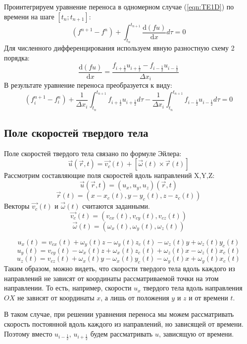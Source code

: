 \documentclass[10pt,a4paper]{article}
\begin{document}
Проинтегрируем уравнение переноса в одномерном случае (\ref{eqn:TE1D}) по времени на шаге $[t_n; t_{n+1}]$:
\[
(f^{n+1}-f^n)+\int_{t_n}^{t_{n+1}}\frac{\text{d}(f u)}{\text{d}x}d\tau=0
\]
Для численного дифференцирования используем явную разностную схему 2 порядка:
\[
\frac{\text{d}(f u)}{\text{d}x}=\frac{f_{i+\frac{1}{2}}u_{i+\frac{1}{2}}-f_{i-\frac{1}{2}}u_{i-\frac{1}{2}}}{\Delta x_i}
\]
В результате уравнение переноса преобразуется к виду:
\begin{equation}
\label{eqn:TE1DdiffScheme}
(f_i^{n+1}-f_i^n)
+
\frac{1}{\Delta x_i}
\int_{t_n}^{t_{n+1}}
f_{i+\frac{1}{2}}u_{i+\frac{1}{2}}d\tau
-
\frac{1}{\Delta x_i}
\int_{t_n}^{t_{n+1}}
f_{i-\frac{1}{2}}u_{i-\frac{1}{2}} d\tau
=0
\end{equation}

\subsection{Поле скоростей твердого тела}
Поле скоростей твердого тела связано по формуле Эйлера:
\[
\overrightarrow{u}(\overrightarrow{r},t)=\overrightarrow{v_c}(t)+[\overrightarrow{\omega}(t)\times \overrightarrow{r}(t)]
\]
Рассмотрим составляющие поля скоростей вдоль направлений X,Y,Z:
\[ \overrightarrow{u}(\overrightarrow{r},t)=(u_x, u_y, u_z)(\overrightarrow{r},t) \]
\[ \overrightarrow{r}(t)=(x-x_c(t), y-y_c(t), z-z_c(t)) \]
Векторы $\overrightarrow{v_c}(t)$ и $\overrightarrow{\omega}(t)$ считаются заданными.
\[ \overrightarrow{v_c}(t)=(v_{cx}(t), v_{cy}(t), v_{cz}(t)) \]
\[ \overrightarrow{\omega}(t)=(\omega_x(t), \omega_y(t), \omega_z(t)) \]

\[ u_x(t)=v_{cx}(t)+\omega_y(t)z-\omega_y(t)z_c(t)-\omega_z(t)y+\omega_z(t)y_c(t) \]
\[ u_y(t)=v_{cy}(t)-\omega_x(t)z+\omega_x(t)z_c(t)+\omega_z(t)x-\omega_z(t)x_c(t) \]
\[ u_z(t)=v_{cz}(t)+\omega_x(t)y-\omega_x(t)y_c(t)-\omega_y(t)x+\omega_y(t)x_c(t) \]
Таким образом, можно видеть, что скорости твердого тела вдоль каждого из направлений не зависят от координаты рассматриваемой точки на этом направлении. То есть, например, скорости $u_x$ твердого тела вдоль направления $OX$ не зависят от координаты $x$, а лишь от положения $y$ и $z$ и от времени $t$.

В таком случае, при решении уравнения переноса мы можем рассматривать скорость постоянной вдоль каждого из направлений, но зависящей от времени. Поэтому вместо $u_{i-\frac{1}{2}}$, $u_{i+\frac{1}{2}}$ будем рассматривать $u$, зависящую от времени.
\end{document}
